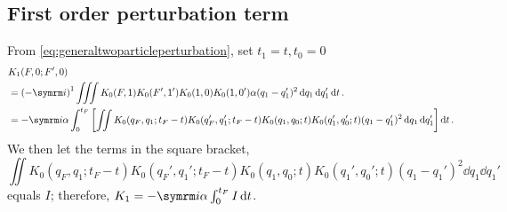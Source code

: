 \subsection{First order perturbation term}
\label{sec:spring_1storder}

From \cref{eq:generaltwoparticleperturbation}, set $t_1 = t, t_0 = 0$
\begin{align}
    &K_1(F, 0; F', 0) \nonumber \\
    &= \left(-\im\right)^1\iiint K_0(F, 1)K_0(F', 1')K_0(1, 0)K_0(1, 0')\alpha(q_1 - q_1')^2\dd{q_1}\dd{q_1'}\dd{t}. \\
    &= -\im\alpha\int_0^{t_F}\left[\iint K_0(q_F, q_1; t_F - t)K_0(q_F', q_1'; t_F - t)K_0(q_1, q_0; t)K_0(q_1', q_0'; t)(q_1 - q_1')^2\dd{q_1}\dd{q_1'}\right]\dd{t}. \nonumber
\end{align}
We then let the terms in the square bracket,
\begin{equation}
    \iint K_0(q_F, q_1; t_F - t)K_0(q_F', q_1'; t_F - t)K_0(q_1, q_0; t)K_0(q_1', q_0'; t)(q_1 - q_1')^2\dd{q_1}\dd{q_1'}
\end{equation}
equals $I$; therefore, $K_1 = -\im\alpha\int_0^{t_F} I\dd{t}$.

